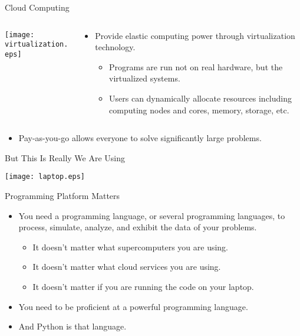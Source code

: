 \documentclass[dvips,xcolor=pst,14pt]{beamer}
\begin{document}
\begin{frame}{
%
Cloud Computing
%
}
\begin{columns}
  \begin{column}{0.35\textwidth}
    \centering
    \texttt{[image: virtualization.eps]}
  \end{column}
  \begin{column}{0.65\textwidth}
    \begin{itemize}
    \item Provide \alert{elastic} computing power through virtualization
    technology.
    \begin{itemize}
      \item Programs are run not on real hardware, but the virtualized systems.
      \item Users can dynamically allocate resources including computing nodes and
      cores, memory, storage, etc.
    \end{itemize}
    \end{itemize}
  \end{column}
\end{columns}
\begin{itemize}
  \item Pay-as-you-go allows everyone to solve significantly large problems.
\end{itemize}
\end{frame}

\begin{frame}{
%
But This Is Really We Are Using
%
}
\begin{center}
  \texttt{[image: laptop.eps]}
\end{center}
\end{frame}

\begin{frame}{
%
Programming Platform Matters
%
}
\begin{itemize}
  \item You need a programming language, or several programming languages, to
  process, simulate, analyze, and exhibit the data of your problems.
  \begin{itemize}
    \item It doesn't matter what supercomputers you are using.
    \item It doesn't matter what cloud services you are using.
    \item It doesn't matter if you are running the code on your laptop.
  \end{itemize}
  \item You need to be proficient at a powerful programming language.
  \item And Python is that language.
\end{itemize}
\end{frame}
\end{document}
